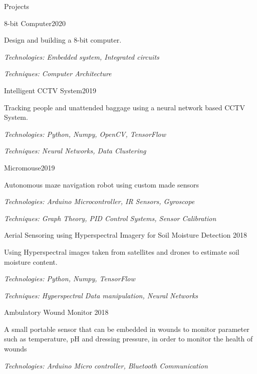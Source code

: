 \documentclass{resume} %
\begin{document}
\begin{rSection}{Projects}
\begin{rSubsection}{8-bit Computer}{2020}{}{}
\item Design and building a 8-bit computer. \item 
\textit{Technologies: Embedded system, Integrated circuits}
\item \textit{Techniques: Computer Architecture }
\end{rSubsection}

\begin{rSubsection}{Intelligent CCTV System}{2019}{}{}
\item Tracking people and unattended baggage using a neural network based CCTV System. \item 
\textit{Technologies: Python, Numpy, OpenCV, TensorFlow}
\item \textit{Techniques: Neural Networks, Data Clustering}
\end{rSubsection}


\begin{rSubsection}{Micromouse}{2019}{}{}
\item Autonomous maze navigation robot using custom made sensors 
\item \textit{Technologies: Arduino Microcontroller, IR Sensors, Gyroscope} 
\item \textit{Techniques: Graph Theory, PID Control Systems, Sensor Calibration}
\end{rSubsection}

\clearpage

\begin{rSubsection}{Aerial Sensoring using Hyperspectral Imagery for Soil Moisture Detection }{2018}{}{}
\item Using Hyperspectral images taken from satellites and drones to estimate soil moisture content. 
\item \textit{Technologies: Python, Numpy, TensorFlow}
\item \textit{Techniques: Hyperspectral Data manipulation, Neural Networks}
\end{rSubsection}


\begin{rSubsection}{Ambulatory Wound Monitor }{2018}{}{}
\item A small portable sensor that can be embedded in wounds to monitor parameter such as temperature, pH and dressing pressure, in order to monitor the health of wounds
\item \textit{Technologies: Arduino Micro controller, Bluetooth Communication}
\end{rSubsection}


\end{rSection}
\end{document}
